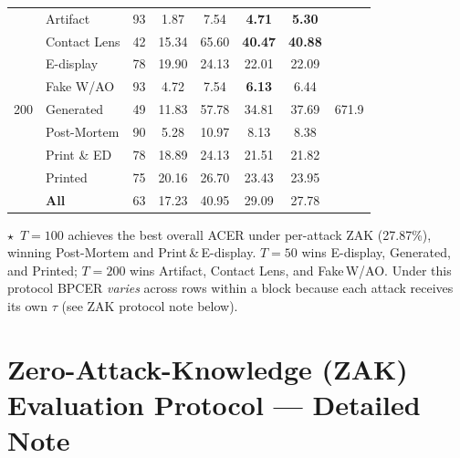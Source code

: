 \documentclass{article}
\newcommand{\B}[1]{\textbf{#1}}
\begin{document}
\begin{table}[!htbp]
\begin{tabular}{l l c c c c c c}
\multirow{9}{*}{200}
& Artifact          & 93 &   1.87 &  7.54 & \B{4.71}  &  \B{5.30} & \multirow{9}{*}{671.9} \\
& Contact Lens      & 42 &  15.34 & 65.60 & \B{40.47} & \B{40.88} & \\
& E-display         & 78 &  19.90 & 24.13 &          22.01 & 22.09 & \\
& Fake W/AO         & 93 &   4.72 &  7.54 & \B{6.13}  &  6.44 & \\
& Generated         & 49 &  11.83 & 57.78 &          34.81 & 37.69 & \\
& Post-Mortem       & 90 &   5.28 & 10.97 &           8.13 &  8.38 & \\
& Print \& ED       & 78 &  18.89 & 24.13 &          21.51 & 21.82 & \\
& Printed           & 75 &  20.16 & 26.70 &          23.43 & 23.95 & \\
\cmidrule(lr){2-7}
& \textbf{All}      & 63 &  17.23 & 40.95 &          29.09 & 27.78 & \\

\bottomrule
\end{tabular}

\vspace{4pt}
\noindent\footnotesize
$\star$~$T{=}100$ achieves the best overall ACER under per-attack ZAK (27.87\%),
winning Post-Mortem and Print\,\&\,E-display.
$T{=}50$ wins E-display, Generated, and Printed;
$T{=}200$ wins Artifact, Contact Lens, and Fake\,W/AO.
Under this protocol BPCER \emph{varies} across rows within a block because each
attack receives its own $\tau$ (see ZAK protocol note below).
\end{table}


\newpage
\section*{Zero-Attack-Knowledge (ZAK) Evaluation Protocol — Detailed Note}
\end{document}
